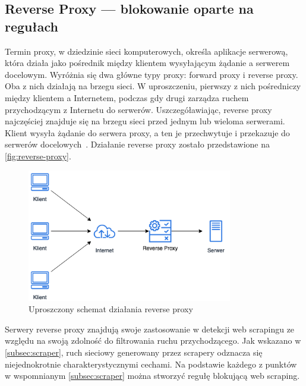 \newpage

\subsection{Reverse Proxy --- blokowanie oparte na regułach}\label{subsec:reverse-proxy}

Termin proxy, w dziedzinie sieci komputerowych, określa aplikacje serwerową, która działa jako pośrednik między klientem wysyłającym żądanie a serwerem docelowym.
Wyróżnia się dwa główne typy proxy: forward proxy i reverse proxy.
Oba z nich działają na brzegu sieci.
W uproszczeniu, pierwszy z nich pośredniczy między klientem a Internetem, podczas gdy drugi zarządza ruchem przychodzącym z Internetu do serwerów.
Uszczegóławiając, reverse proxy najczęściej znajduje się na brzegu sieci przed jednym lub wieloma serwerami.
Klient wysyła żądanie do serwera proxy, a ten je przechwytuje i przekazuje do serwerów docelowych~\cite{cloudflare-what-is-reverse-proxy}.
Działanie reverse proxy zostało przedstawione na \autoref{fig:reverse-proxy}.

\begin{figure}[H]
    \centering
    \captionsetup{width=.7\linewidth}
    \includegraphics[width=0.8\textwidth]{img/reverse-proxy}
    \caption{Uproszczony schemat działania reverse proxy}
    \label{fig:reverse-proxy}
\end{figure}

Serwery reverse proxy znajdują swoje zastosowanie w detekcji web scrapingu ze względu na swoją zdolność do filtrowania ruchu przychodzącego.
Jak wskazano w \autoref{subsec:scraper}, ruch sieciowy generowany przez scrapery odznacza się niejednokrotnie charakterystycznymi cechami.
Na podstawie każdego z punktów w wspomnianym \autoref{subsec:scraper} można stworzyć regułę blokującą web scraping.

\newpage

